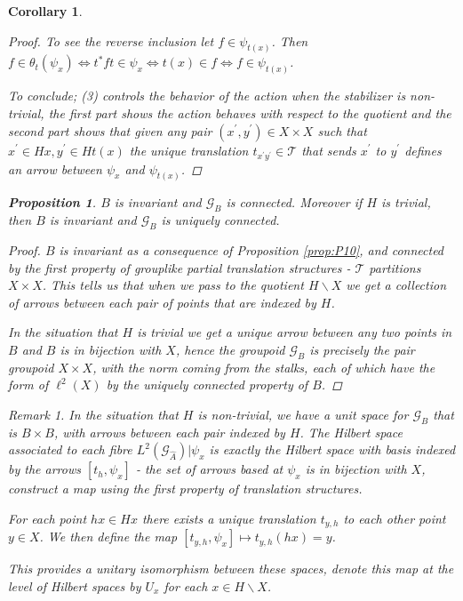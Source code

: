 \documentclass[11pt]{amsart}
\theoremstyle{plain}
\newtheorem{proposition}[theorem]{Proposition}%
\newtheorem{corollary}[theorem]{Corollary}%
\theoremstyle{definition}%
\theoremstyle{remark}%
\newtheorem{remark}[theorem]{Remark}%
\newcommand{\G}{\mathcal{G}}
\newcommand{\A}{\widehat{A}}
\begin{document}
\begin{corollary}
\begin{proof}
To see the reverse inclusion let $f \in \psi_{t(x)}$. Then $f \in \theta_{t}(\psi_{x}) \Leftrightarrow t^{*}ft \in \psi_{x} \Leftrightarrow t(x) \in f \Leftrightarrow f \in \psi_{t(x)}$. 

To conclude; (3) controls the behavior of the action when the stabilizer is non-trivial, the first part shows the action behaves with respect to the quotient and the second part shows that given any pair $(x^{'},y^{'})\in X \times X$ such that $x^{'}\in Hx, y^{'}\in Ht(x)$ the unique translation $t_{x^{'}y^{'}} \in \mathcal{T}$ that sends $x^{'}$ to $y^{'}$ defines an arrow between $\psi_{x}$ and $\psi_{t(x)}$. 
\end{proof}

\begin{proposition}\label{cor:C4}
$B$ is invariant and $\G_{B}$ is connected. Moreover if $H$ is trivial, then $B$ is invariant and $\G_{B}$ is uniquely connected.
\end{proposition}
\begin{proof}
$B$ is invariant as a consequence of Proposition \ref{prop:P10}, and connected by the first property of grouplike partial translation structures - $\mathcal{T}$ partitions $X \times X$. This tells us that when we pass to the quotient $H \backslash X$ we get a collection of arrows between each pair of points that are indexed by $H$. 

In the situation that $H$ is trivial we get a unique arrow between any two points in $B$ and $B$ is in bijection with $X$, hence the groupoid $\G_{B}$ is precisely the pair groupoid $X \times X$, with the norm coming from the stalks, each of which have the form of $\ell^{2}(X)$ by the uniquely connected property of $B$.
\end{proof}

\begin{remark}
In the situation that $H$ is non-trivial, we have a unit space for $\G_{B}$ that is $B\times B$, with arrows between each pair indexed by $H$. The Hilbert space associated to each fibre $L^{2}(\G_{\A})|\psi_{x}$ is exactly the Hilbert space with basis indexed by the \textit{arrows} $[t_{h},\psi_{x}]$ - the set of arrows based at $\psi_{x}$ is in bijection with $X$, construct a map using the first property of translation structures.

For each point $hx \in Hx$ there exists a unique translation $t_{y,h}$ to each other point $y \in X$. We then define the map $[t_{y,h}, \psi_{x}] \mapsto t_{y,h}(hx)=y$.

This provides a unitary isomorphism between these spaces, denote this map at the level of Hilbert spaces by $U_{x}$ for each $x \in H \backslash X$.
\end{remark}


\end{corollary}
\end{document}
